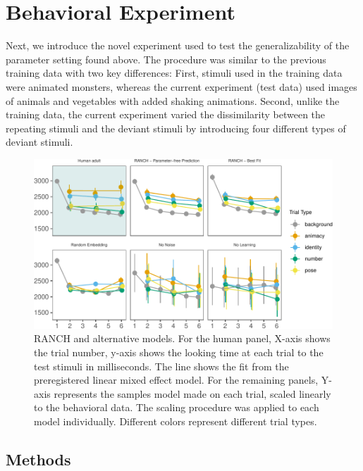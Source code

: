 \documentclass[10pt, letterpaper]{article}
\newenvironment{CodeChunk}{}{}
\begin{document}
\hypertarget{behavioral-experiment}{%
\section{Behavioral Experiment}\label{behavioral-experiment}}

Next, we introduce the novel experiment used to test the
generalizability of the parameter setting found above. The procedure was
similar to the previous training data with two key differences: First,
stimuli used in the training data were animated monsters, whereas the
current experiment (test data) used images of animals and vegetables
with added shaking animations. Second, unlike the training data, the
current experiment varied the dissimilarity between the repeating
stimuli and the deviant stimuli by introducing four different types of
deviant stimuli.

\begin{CodeChunk}
\begin{figure}[h!]

{\centering \includegraphics{figs/lol-1} 

}

\caption[RANCH and alternative models]{RANCH and alternative models. For the human panel, X-axis shows the trial number, y-axis shows the looking time at each trial to the test stimuli in milliseconds. The line shows the fit from the preregistered linear mixed effect model. For the remaining panels, Y-axis represents the samples model made on each trial, scaled linearly to the behavioral data. The scaling procedure was applied to each model individually. Different colors represent different trial types.}\label{fig:lol}
\end{figure}
\end{CodeChunk}

\hypertarget{methods}{%
\subsection{Methods}\label{methods}}
\end{document}

